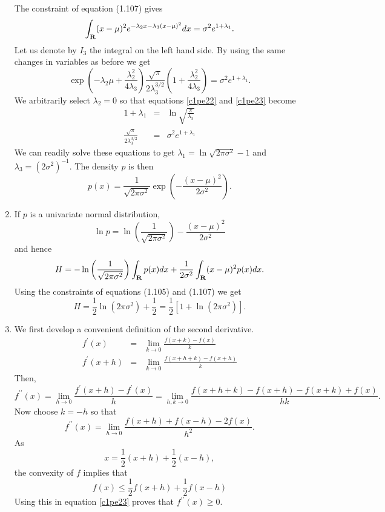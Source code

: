 \begin{enumerate}
The constraint of equation (1.107) gives
\[
\int_{\mathbf{R}} (x - \mu)^2e^{-\lambda_2 x - \lambda_3(x - \mu)^2}dx = \sigma^2 e^{1 + \lambda_1}.
\]
Let us denote by $I_3$ the integral on the left hand side. By using the same changes in variables
as before we get
\begin{equation}\label{c1pe23}
\exp\left(-\lambda_2\mu + \frac{\lambda_2^2}{4\lambda_3}\right)\frac{\sqrt{\pi}}{2\lambda_3^{3/2}}\left(1 + \frac{\lambda_2^2}{4\lambda_3}\right) = \sigma^2 e^{1 + \lambda_1}.
\end{equation}
We arbitrarily select $\lambda_2 = 0$ so that equations \eqref{c1pe22} and \eqref{c1pe23} become
\begin{eqnarray*}
1 + \lambda_1 &=& \ln\sqrt{\frac{\pi}{\lambda_3}} \\
\frac{\sqrt{\pi}}{2\lambda_3^{3/2}} &=& \sigma^2 e^{1 + \lambda_1}
\end{eqnarray*}
We can readily solve these equations to get $\lambda_1 = \ln\sqrt{2\pi\sigma^2} - 1$ and 
$\lambda_3 = (2\sigma^2)^{-1}$. The density $p$ is then
\[
p(x) = \frac{1}{\sqrt{2\pi\sigma^2}}\exp\left(-\frac{(x - \mu)^2}{2\sigma^2}\right).
\]

\item If $p$ is a univariate normal distribution,
\[
\ln p = \ln\left(\frac{1}{\sqrt{2\pi\sigma^2}}\right) - \frac{(x - \mu)^2}{2\sigma^2}
\]
and hence
\[
H = -\ln\left(\frac{1}{\sqrt{2\pi\sigma^2}}\right)\int_{\mathbf{R}} p(x)dx + \frac{1}{2\sigma^2}\int_{\mathbf{R}} (x - \mu)^2 p(x)dx.
\]
Using the constraints of equations (1.105) and (1.107) we get
\[
H = \frac{1}{2}\ln(2\pi\sigma^2) + \frac{1}{2} = \frac{1}{2}[1 + \ln(2\pi\sigma^2)].
\]

\item We first develop a convenient definition of the second derivative.
\begin{eqnarray*}
f^\prime(x) &=& \lim_{k \to 0}\frac{f(x+k) - f(x)}{k} \\
f^\prime(x+h) &=& \lim_{k \to 0}\frac{f(x+h+k) - f(x+h)}{k}
\end{eqnarray*}
Then,
\[
f^{\prime\prime}(x) = \lim_{h \to 0}\frac{f^\prime(x+h) - f^\prime(x)}{h} = \lim_{h,k \to 0}\frac{f(x+h+k) - f(x+h) - f(x+k) + f(x)}{hk}.
\]
Now choose $k = -h$ so that
\begin{equation}\label{c1pe24}
f^{\prime\prime}(x) = \lim_{h \to 0}\frac{f(x+h) + f(x-h) - 2f(x)}{h^2}.
\end{equation}
As 
\[
x = \frac{1}{2}(x + h) + \frac{1}{2}(x - h),
\]
the convexity of $f$ implies that
\[
f(x) \le \frac{1}{2}f(x+h) + \frac{1}{2}f(x-h)
\]
Using this in equation \eqref{c1pe23} proves that $f^{\prime\prime}(x) \ge 0$.


\end{enumerate}
